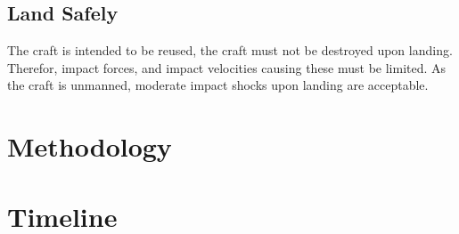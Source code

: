 \documentclass{sydeStyle}
\begin{document}
\section{Land Safely}

The craft is intended to be reused, the craft must not be destroyed
upon landing. Therefor, impact forces, and impact velocities causing these must
be limited. As the craft is unmanned, moderate impact shocks upon landing are
acceptable.

\chapter{Methodology}


\chapter{Timeline}


\end{document}

